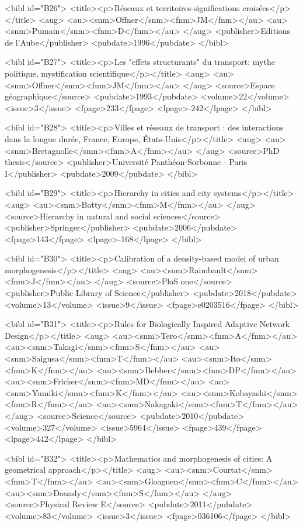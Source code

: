 \documentclass{article}
\begin{document}
{<bibl id="B26">
  <title><p>R{\'e}seaux et territoires-significations crois{\'e}es</p></title>
  <aug>
    <au><snm>Offner</snm><fnm>JM</fnm></au>
    <au><snm>Pumain</snm><fnm>D</fnm></au>
  </aug>
  <publisher>Editions de l'Aube</publisher>
  <pubdate>1996</pubdate>
</bibl>

<bibl id="B27">
  <title><p>Les "effets structurants" du transport: mythe politique,
  mystification scientifique</p></title>
  <aug>
    <au><snm>Offner</snm><fnm>JM</fnm></au>
  </aug>
  <source>Espace g{\'e}ographique</source>
  <pubdate>1993</pubdate>
  <volume>22</volume>
  <issue>3</issue>
  <fpage>233</fpage>
  <lpage>-242</lpage>
</bibl>

<bibl id="B28">
  <title><p>{Villes et r{\'e}seaux de transport : des interactions dans la
  longue dur{\'e}e, France, Europe, {\'E}tats-Unis}</p></title>
  <aug>
    <au><snm>Bretagnolle</snm><fnm>A</fnm></au>
  </aug>
  <source>PhD thesis</source>
  <publisher>Universit{\'e} Panth{\'e}on-Sorbonne - Paris I</publisher>
  <pubdate>2009</pubdate>
</bibl>

<bibl id="B29">
  <title><p>Hierarchy in cities and city systems</p></title>
  <aug>
    <au><snm>Batty</snm><fnm>M</fnm></au>
  </aug>
  <source>Hierarchy in natural and social sciences</source>
  <publisher>Springer</publisher>
  <pubdate>2006</pubdate>
  <fpage>143</fpage>
  <lpage>-168</lpage>
</bibl>

<bibl id="B30">
  <title><p>Calibration of a density-based model of urban
  morphogenesis</p></title>
  <aug>
    <au><snm>Raimbault</snm><fnm>J</fnm></au>
  </aug>
  <source>PloS one</source>
  <publisher>Public Library of Science</publisher>
  <pubdate>2018</pubdate>
  <volume>13</volume>
  <issue>9</issue>
  <fpage>e0203516</fpage>
</bibl>

<bibl id="B31">
  <title><p>Rules for Biologically Inspired Adaptive Network Design</p></title>
  <aug>
    <au><snm>Tero</snm><fnm>A</fnm></au>
    <au><snm>Takagi</snm><fnm>S</fnm></au>
    <au><snm>Saigusa</snm><fnm>T</fnm></au>
    <au><snm>Ito</snm><fnm>K</fnm></au>
    <au><snm>Bebber</snm><fnm>DP</fnm></au>
    <au><snm>Fricker</snm><fnm>MD</fnm></au>
    <au><snm>Yumiki</snm><fnm>K</fnm></au>
    <au><snm>Kobayashi</snm><fnm>R</fnm></au>
    <au><snm>Nakagaki</snm><fnm>T</fnm></au>
  </aug>
  <source>Science</source>
  <pubdate>2010</pubdate>
  <volume>327</volume>
  <issue>5964</issue>
  <fpage>439</fpage>
  <lpage>442</lpage>
</bibl>

<bibl id="B32">
  <title><p>Mathematics and morphogenesis of cities: A geometrical
  approach</p></title>
  <aug>
    <au><snm>Courtat</snm><fnm>T</fnm></au>
    <au><snm>Gloaguen</snm><fnm>C</fnm></au>
    <au><snm>Douady</snm><fnm>S</fnm></au>
  </aug>
  <source>Physical Review E</source>
  <pubdate>2011</pubdate>
  <volume>83</volume>
  <issue>3</issue>
  <fpage>036106</fpage>
</bibl>

}
\end{document}
